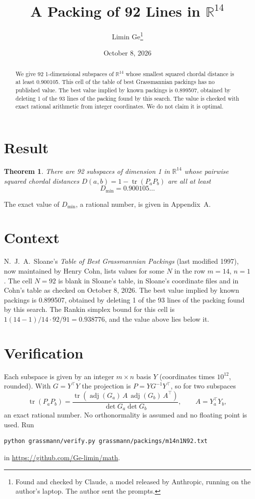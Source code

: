 \documentclass[11pt,a4paper]{article}
\title{A Packing of 92 Lines in $\mathbb{R}^{14}$}
\author{Limin Ge\thanks{Found and checked by Claude, a model released by Anthropic, running on the author's laptop. The author sent the prompts.}}
\date{October 8, 2026}
\newtheorem*{theorem}{Theorem}
\begin{document}
\maketitle
\begin{abstract}
We give 92 1-dimensional subspaces of $\mathbb{R}^{14}$ whose smallest squared chordal distance is at least 0.900105. This cell of the table of best Grassmannian packings has no published value. The best value implied by known packings is 0.899507, obtained by deleting 1 of the 93 lines of the packing found by this search. The value is checked with exact rational arithmetic from integer coordinates. We do not claim it is optimal.
\end{abstract}

\section{Result}
\begin{theorem}
There are 92 subspaces of dimension 1 in $\mathbb{R}^{14}$ whose pairwise squared chordal distances $D(a,b) = 1 - \operatorname{tr}(P_aP_b)$ are all at least
\[ D_{\min} = 0.900105\ldots \]
\end{theorem}
The exact value of $D_{\min}$, a rational number, is given in Appendix~A.


\section{Context}
N.~J.~A.~Sloane's \emph{Table of Best Grassmannian Packings} (last modified 1997), now maintained by Henry Cohn, lists values for some $N$ in the row $m=14$, $n=1$. The cell $N=92$ is blank in Sloane's table, in Sloane's coordinate files and in Cohn's table as checked on October 8, 2026. The best value implied by known packings is 0.899507, obtained by deleting 1 of the 93 lines of the packing found by this search. The Rankin simplex bound for this cell is $1(14-1)/14\cdot 92/91 = 0.938776$, and the value above lies below it.


\section{Verification}
Each subspace is given by an integer $m\times n$ basis $Y$ (coordinates times $10^{12}$, rounded). With $G=Y^\top Y$ the projection is $P=YG^{-1}Y^\top$, so for two subspaces
\[ \operatorname{tr}(P_aP_b)=\frac{\operatorname{tr}(\operatorname{adj}(G_a)\,A\,\operatorname{adj}(G_b)\,A^\top)}{\det G_a\det G_b},\qquad A=Y_a^\top Y_b, \]
an exact rational number. No orthonormality is assumed and no floating point is used. Run
\begin{verbatim}
python grassmann/verify.py grassmann/packings/m14n1N92.txt
\end{verbatim}
in \url{https://github.com/Ge-limin/math}.
\end{document}
